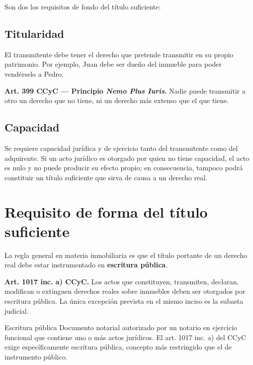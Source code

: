 \documentclass[12pt,oneside]{book}
\begin{document}
Son dos los requisitos de fondo del título suficiente:

\subsection{Titularidad}

El transmitente debe tener el derecho que pretende transmitir en su propio patrimonio. Por ejemplo, Juan debe ser dueño del inmueble para poder vendérselo a Pedro.

\begin{note}
\textbf{Art. 399 CCyC — Principio \textit{Nemo Plus Iuris}.} Nadie puede transmitir a otro un derecho que no tiene, ni un derecho más extenso que el que tiene.
\end{note}

\subsection{Capacidad}

Se requiere capacidad jurídica y de ejercicio tanto del transmitente como del adquirente. Si un acto jurídico es otorgado por quien no tiene capacidad, el acto es nulo y no puede producir su efecto propio; en consecuencia, tampoco podrá constituir un título suficiente que sirva de causa a un derecho real.

\section{Requisito de forma del título suficiente}

La regla general en materia inmobiliaria es que el título portante de un derecho real debe estar instrumentado en \textbf{escritura pública}.

\begin{note}
\textbf{Art. 1017 inc. a) CCyC.} Los actos que constituyen, transmiten, declaran, modifican o extinguen derechos reales sobre inmuebles deben ser otorgados por escritura pública. La única excepción prevista en el mismo inciso es la subasta judicial.
\end{note}

\begin{definition}{Escritura pública}
Documento notarial autorizado por un notario en ejercicio funcional que contiene uno o más actos jurídicos. El art. 1017 inc. a) del CCyC exige específicamente escritura pública, concepto más restringido que el de instrumento público.
\end{definition}
\end{document}
